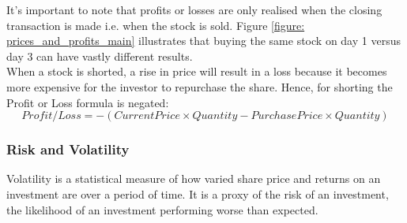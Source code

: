 \documentclass[a4paper,12pt]{report}
\numberwithin{equation}{section}
\theoremstyle{definition}
\begin{document}
It's important to note that profits or losses are only realised when the closing transaction is made i.e. when the stock is sold. Figure \ref{figure: prices_and_profits_main} illustrates that buying the same stock on day 1 versus day 3 can have vastly different results. \\

When a stock is shorted, a rise in price will result in a loss because it becomes more expensive for the investor to repurchase the share. Hence, for shorting the Profit or Loss formula is negated:
\begin{equation*}
  Profit/Loss = -(Current Price \times Quantity - Purchase Price \times Quantity)
\end{equation*}


\subsubsection{Risk and Volatility} \label{Risk and Volatility}
Volatility is a statistical measure of how varied share price and returns on an investment are over a period of time. It is a proxy of the risk of an investment, the likelihood of an investment performing worse than expected. \\
\end{document}
